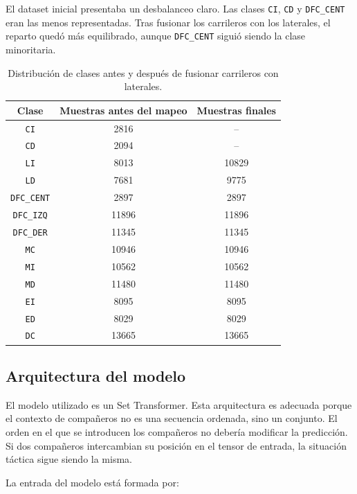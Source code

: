El dataset inicial presentaba un desbalanceo claro. Las clases \texttt{CI}, \texttt{CD} y \texttt{DFC\_CENT} eran las menos representadas. Tras fusionar los carrileros con los laterales, el reparto quedó más equilibrado, aunque \texttt{DFC\_CENT} siguió siendo la clase minoritaria.

\begin{table}[H]
\centering
\scriptsize
\begin{tabular}{c|c|c}
\textbf{Clase} & \textbf{Muestras antes del mapeo} & \textbf{Muestras finales} \\
\hline\hline
\texttt{CI} & 2816 & -- \\
\hline
\texttt{CD} & 2094 & -- \\
\hline
\texttt{LI} & 8013 & 10829 \\
\hline
\texttt{LD} & 7681 & 9775 \\
\hline
\texttt{DFC\_CENT} & 2897 & 2897 \\
\hline
\texttt{DFC\_IZQ} & 11896 & 11896 \\
\hline
\texttt{DFC\_DER} & 11345 & 11345 \\
\hline
\texttt{MC} & 10946 & 10946 \\
\hline
\texttt{MI} & 10562 & 10562 \\
\hline
\texttt{MD} & 11480 & 11480 \\
\hline
\texttt{EI} & 8095 & 8095 \\
\hline
\texttt{ED} & 8029 & 8029 \\
\hline
\texttt{DC} & 13665 & 13665 \\
\hline
\end{tabular}
\caption{Distribución de clases antes y después de fusionar carrileros con laterales.}
\label{tab:position_class_distribution}
\end{table}

\subsection{Arquitectura del modelo}

El modelo utilizado es un Set Transformer. Esta arquitectura es adecuada porque el contexto de compañeros no es una secuencia ordenada, sino un conjunto. El orden en el que se introducen los compañeros no debería modificar la predicción. Si dos compañeros intercambian su posición en el tensor de entrada, la situación táctica sigue siendo la misma.

La entrada del modelo está formada por:

